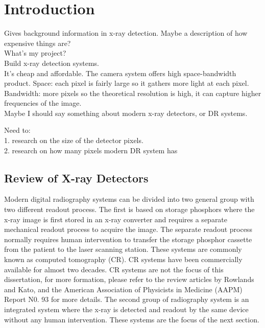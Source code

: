 \chapter{Introduction}
Gives background information in x-ray detection. Maybe a description of how expensive things are? \\
What's my project?\\
	Build x-ray detection systems.\\
	It's cheap and affordable.  The camera system offers high space-bandwidth product.  Space: each pixel is fairly large so it gathers more light at each pixel. Bandwidth: more pixels so the theoretical resolution is high, it can capture higher frequencies of the image.\\
	Maybe I should say something about modern x-ray detectors, or DR systems.
	
	
Need to:\\
	1. research on the size of the detector pixels.\\
	2. research on how many pixels modern DR system has\\


\section{Review of X-ray Detectors}
Modern digital radiography systems can be divided into two general group with two different readout process.  The first is based on storage phosphors where the x-ray image is first stored in an x-ray converter and requires a separate mechanical readout process to acquire the image.  The separate readout process normally requires human intervention to transfer the storage phosphor cassette from the patient to the laser scanning station.  These systems are commonly known as computed tomography (CR).  CR systems have been commercially available for almost two decades.  CR systems are not the focus of this dissertation, for more formation, please refer to the review articles by Rowlands\cite{Rowlands2002} and Kato\cite{kato1994}, and the American Association of Physicists in Medicine (AAPM) Report N0. 93 for more details\cite{AAPM93}. The second group of radiography system is an integrated system where the x-ray is detected and readout by the same device without any human intervention.  These systems are the focus of the next section.

